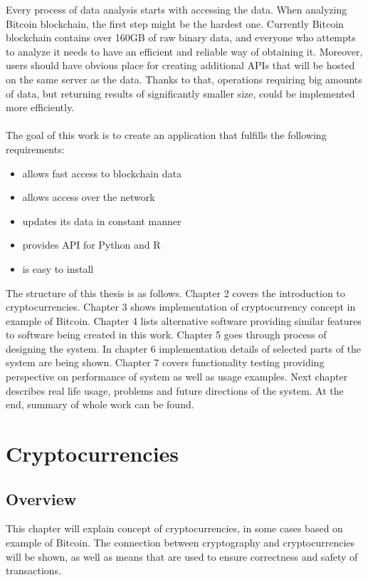 \documentclass[12pt, en, eng, oneside, final]{mgr}
\begin{document}
Every process of data analysis starts with accessing the data. When analyzing Bitcoin blockchain, the first step might be the hardest one. Currently Bitcoin blockchain contains over 160GB of raw binary data, and everyone who attempts to analyze it needs to have an efficient and reliable way of obtaining it. Moreover, users should have obvious place for creating additional APIs that will be hosted on the same server as the data. Thanks to that, operations requiring big amounts of data, but returning results of significantly smaller size, could be implemented more efficiently.
\\
\\
The goal of this work is to create an application that fulfills the following requirements: 
\begin{itemize}

\item
allows fast access to blockchain data
\item
allows access over the network
\item
updates its data in constant manner
\item
provides API for Python and R
\item
is easy to install

\end{itemize}

The structure of this thesis is as follows. Chapter 2 covers the introduction to cryptocurrencies. Chapter 3 shows implementation of cryptocurrency concept in example of Bitcoin. Chapter 4 lists alternative software providing similar features to software being created in this work. Chapter 5 goes through process of designing the system. In chapter 6 implementation details of selected parts of the system are being shown. Chapter 7 covers functionality testing providing perspective on performance of system as well as usage examples. Next chapter describes real life usage, problems and future directions of the system. At the end, summary of whole work can be found. 

\chapter{Cryptocurrencies}

\section{Overview}
This chapter will explain concept of cryptocurrencies, in some cases based on example of Bitcoin. The connection between cryptography and cryptocurrencies will be shown, as well as means that are used to ensure correctness and safety of transactions.
\end{document}
